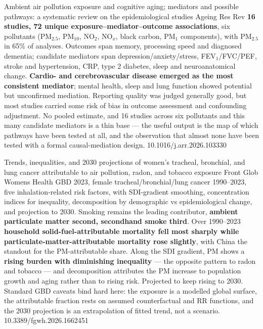 \documentclass[10pt]{article}
\begin{document}
{Ambient air pollution exposure and cognitive aging; mediators and possible pathways: a systematic review on the epidemiological studies}
{Ageing Res Rev}
{\textbf{16 studies, 72 unique exposure--mediator--outcome associations}, six pollutants
(PM$_{2.5}$, PM$_{10}$, NO$_2$, NO$_x$, black carbon, PM$_1$ components), with PM$_{2.5}$
in 65\% of analyses. Outcomes span memory, processing speed and diagnosed dementia;
candidate mediators span depression/anxiety/stress, FEV$_1$/FVC/PEF, stroke and
hypertension, CRP, type 2 diabetes, sleep and neuroanatomical change. \textbf{Cardio- and
cerebrovascular disease emerged as the most consistent mediator}; mental health, sleep and
lung function showed potential but unconfirmed mediation. Reporting quality was judged
generally good, but most studies carried some risk of bias in outcome assessment and
confounding adjustment. No pooled estimate, and 16 studies across six pollutants and this
many candidate mediators is a thin base --- the useful output is the map of which pathways
have been tested at all, and the observation that almost none have been tested with a
formal causal-mediation design.}
{10.1016/j.arr.2026.103330}


{Trends, inequalities, and 2030 projections of women's tracheal, bronchial, and lung cancer attributable to air pollution, radon, and tobacco exposure}
{Front Glob Womens Health}
{GBD 2023, female tracheal/bronchial/lung cancer 1990--2023, five inhalation-related risk
factors, with SDI-gradient smoothing, concentration indices for inequality, decomposition
by demographic vs epidemiological change, and projection to 2030. Smoking remains the
leading contributor, \textbf{ambient particulate matter second, secondhand smoke third}.
Over 1990--2023 \textbf{household solid-fuel-attributable mortality fell most sharply
while particulate-matter-attributable mortality rose slightly}, with China the standout
for the PM-attributable share. Along the SDI gradient, PM shows a \textbf{rising burden
with diminishing inequality} --- the opposite pattern to radon and tobacco --- and
decomposition attributes the PM increase to population growth and aging rather than to
rising risk. Projected to keep rising to 2030. Standard GBD caveats bind hard here:
the exposure is a modelled global surface, the attributable fraction rests on assumed
counterfactual and RR functions, and the 2030 projection is an extrapolation of fitted
trend, not a scenario.}
{10.3389/fgwh.2026.1662451}
\end{document}
